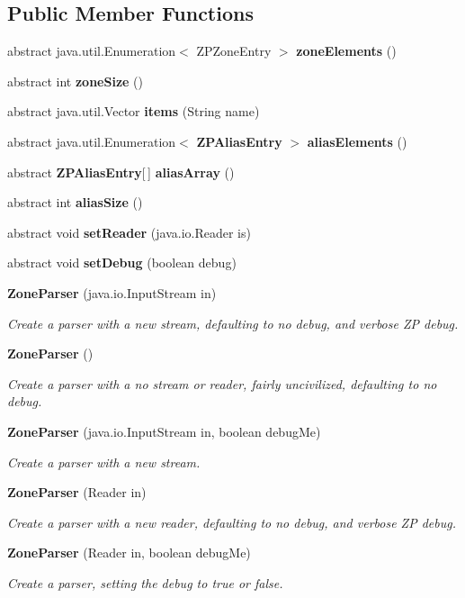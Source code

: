 \subsection*{Public Member Functions}
\begin{DoxyCompactItemize}
\item 
abstract java.\+util.\+Enumeration$<$ Z\+P\+Zone\+Entry $>$ {\bf zone\+Elements} ()
\item 
abstract int {\bf zone\+Size} ()
\item 
abstract java.\+util.\+Vector {\bf items} (String name)
\item 
abstract java.\+util.\+Enumeration$<$ {\bf Z\+P\+Alias\+Entry} $>$ {\bf alias\+Elements} ()
\item 
abstract {\bf Z\+P\+Alias\+Entry}[$\,$] {\bf alias\+Array} ()
\item 
abstract int {\bf alias\+Size} ()
\item 
abstract void {\bf set\+Reader} (java.\+io.\+Reader is)
\item 
abstract void {\bf set\+Debug} (boolean debug)
\item 
{\bf Zone\+Parser} (java.\+io.\+Input\+Stream in)
\begin{DoxyCompactList}\small\item\em Create a parser with a new stream, defaulting to no debug, and verbose Z\+P debug. \end{DoxyCompactList}\item 
{\bf Zone\+Parser} ()
\begin{DoxyCompactList}\small\item\em Create a parser with a no stream or reader, fairly uncivilized, defaulting to no debug. \end{DoxyCompactList}\item 
{\bf Zone\+Parser} (java.\+io.\+Input\+Stream in, boolean debug\+Me)
\begin{DoxyCompactList}\small\item\em Create a parser with a new stream. \end{DoxyCompactList}\item 
{\bf Zone\+Parser} (Reader in)
\begin{DoxyCompactList}\small\item\em Create a parser with a new reader, defaulting to no debug, and verbose Z\+P debug. \end{DoxyCompactList}\item 
{\bf Zone\+Parser} (Reader in, boolean debug\+Me)
\begin{DoxyCompactList}\small\item\em Create a parser, setting the debug to true or false. \end{DoxyCompactList}\item 

\end{DoxyCompactItemize}
